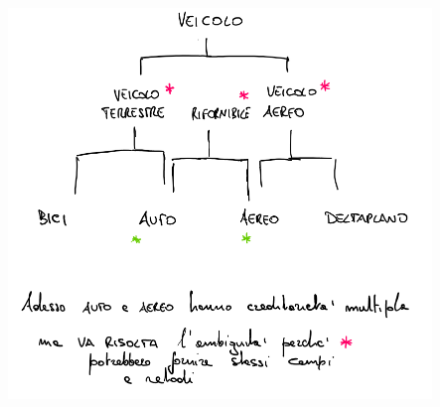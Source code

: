 \documentclass{article}
\begin{document}
    \begin{figure}[htbp]
        \center
        \includegraphics[scale=0.3]{img/ereditMultipla.png}
    \end{figure}
\end{document}

